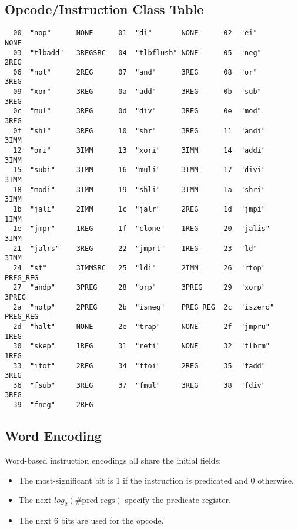 \documentclass[10pt,letterpaper]{article}
\begin{document}
\subsection{Opcode/Instruction Class Table}
\begin{verbatim}
  00  "nop"      NONE      01  "di"       NONE      02  "ei"       NONE 
  03  "tlbadd"   3REGSRC   04  "tlbflush" NONE      05  "neg"      2REG     
  06  "not"      2REG      07  "and"      3REG      08  "or"       3REG     
  09  "xor"      3REG      0a  "add"      3REG      0b  "sub"      3REG     
  0c  "mul"      3REG      0d  "div"      3REG      0e  "mod"      3REG
  0f  "shl"      3REG      10  "shr"      3REG      11  "andi"     3IMM     
  12  "ori"      3IMM      13  "xori"     3IMM      14  "addi"     3IMM     
  15  "subi"     3IMM      16  "muli"     3IMM      17  "divi"     3IMM     
  18  "modi"     3IMM      19  "shli"     3IMM      1a  "shri"     3IMM     
  1b  "jali"     2IMM      1c  "jalr"     2REG      1d  "jmpi"     1IMM
  1e  "jmpr"     1REG      1f  "clone"    1REG      20  "jalis"    3IMM
  21  "jalrs"    3REG      22  "jmprt"    1REG      23  "ld"       3IMM
  24  "st"       3IMMSRC   25  "ldi"      2IMM      26  "rtop"     PREG_REG
  27  "andp"     3PREG     28  "orp"      3PREG     29  "xorp"     3PREG    
  2a  "notp"     2PREG     2b  "isneg"    PREG_REG  2c  "iszero"   PREG_REG 
  2d  "halt"     NONE      2e  "trap"     NONE      2f  "jmpru"    1REG
  30  "skep"     1REG      31  "reti"     NONE      32  "tlbrm"    1REG
  33  "itof"     2REG      34  "ftoi"     2REG      35  "fadd"     3REG
  36  "fsub"     3REG      37  "fmul"     3REG      38  "fdiv"     3REG
  39  "fneg"     2REG
\end{verbatim}

\subsection{Word Encoding}

Word-based instruction encodings all share the initial fields:
\begin{itemize}
  \item The most-significant bit is 1 if the instruction is predicated and 0 otherwise.
  \item The next $log_2(\mathrm{\#pred\_regs})$ specify the predicate register.
  \item The next 6 bits are used for the opcode.
\end{itemize}
\end{document}
